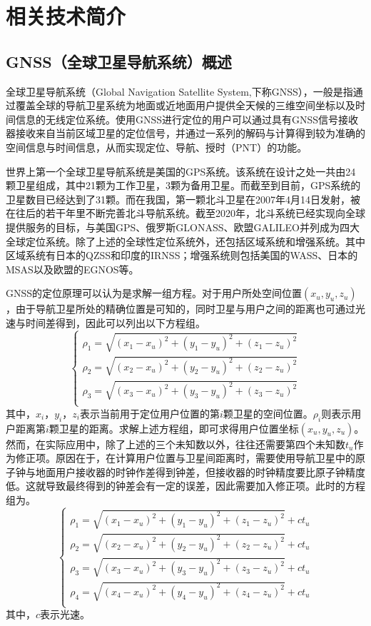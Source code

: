 \section{相关技术简介}

\subsection{GNSS（全球卫星导航系统）概述}
全球卫星导航系统（Global Navigation Satellite System,下称GNSS），一般是指通过覆盖全球的导航卫星系统为地面或近地面用户提供全天候的三维空间坐标以及时间信息的无线定位系统。使用GNSS进行定位的用户可以通过具有GNSS信号接收器接收来自当前区域卫星的定位信号，并通过一系列的解码与计算得到较为准确的空间信息与时间信息，从而实现定位、导航、授时（PNT）的功能。

世界上第一个全球卫星导航系统是美国的GPS系统。该系统在设计之处一共由24颗卫星组成，其中21颗为工作卫星，3颗为备用卫星。而截至到目前，GPS系统的卫星数目已经达到了31颗。而在我国，第一颗北斗卫星在2007年4月14日发射，被在往后的若干年里不断完善北斗导航系统。截至2020年，北斗系统已经实现向全球提供服务的目标，与美国GPS、俄罗斯GLONASS、欧盟GALILEO并列成为四大全球定位系统。除了上述的全球性定位系统外，还包括区域系统和增强系统。其中区域系统有日本的QZSS和印度的IRNSS；增强系统则包括美国的WASS、日本的MSAS以及欧盟的EGNOS等。

GNSS的定位原理可以认为是求解一组方程。对于用户所处空间位置$(x_u, y_u, z_u)$，由于导航卫星所处的精确位置是可知的，同时卫星与用户之间的距离也可通过光速与时间差得到，因此可以列出以下方程组。
\begin{equation}
    \begin{cases}
        \rho_1=\sqrt{(x_1-x_u)^2+(y_1-y_u)^2+(z_1-z_u)^2}\\
        \rho_2=\sqrt{(x_2-x_u)^2+(y_2-y_u)^2+(z_2-z_u)^2}\\
        \rho_3=\sqrt{(x_3-x_u)^2+(y_3-y_u)^2+(z_3-z_u)^2}\\
    \end{cases}
    \label{eq:1}
\end{equation}
其中，$x_i$，$y_i$，$z_i$表示当前用于定位用户位置的第$i$颗卫星的空间位置。$\rho_i$则表示用户距离第$i$颗卫星的距离。求解上述方程组，即可求得用户位置坐标$(x_u,y_u,z_u)$。然而，在实际应用中，除了上述的三个未知数以外，往往还需要第四个未知数$t_u$作为修正项。原因在于，在计算用户位置与卫星间距离时，需要使用导航卫星中的原子钟与地面用户接收器的时钟作差得到钟差，但接收器的时钟精度要比原子钟精度低。这就导致最终得到的钟差会有一定的误差，因此需要加入修正项。此时的方程组为。
\begin{equation}
    \begin{cases}
        \rho_1=\sqrt{(x_1-x_u)^2+(y_1-y_u)^2+(z_1-z_u)^2}+ct_u\\
        \rho_2=\sqrt{(x_2-x_u)^2+(y_2-y_u)^2+(z_2-z_u)^2}+ct_u\\
        \rho_3=\sqrt{(x_3-x_u)^2+(y_3-y_u)^2+(z_3-z_u)^2}+ct_u\\
        \rho_4=\sqrt{(x_4-x_u)^2+(y_4-y_u)^2+(z_4-z_u)^2}+ct_u\\
    \end{cases}
    \label{eq:2}
\end{equation}
其中，$c$表示光速。
